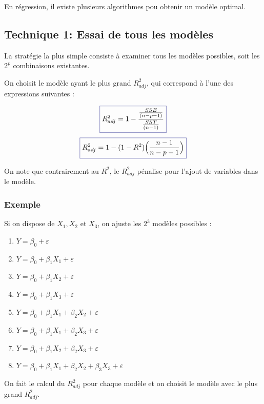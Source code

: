 \documentclass[11pt,french]{report}
\begin{document}
En régression, il existe plusieurs algorithmes pou obtenir un modèle optimal.

\subsection{Technique 1: Essai de tous les modèles}
\label{tech1}

La stratégie la plus simple consiste à examiner tous les modèles possibles, soit les $2^p$ combinaisons existantes. \newline

On choisit le modèle ayant le plus grand $R^2_{adj}$, qui correspond à l'une des expressions suivantes :

\begin{equation}
\color{Blue}
\boxed{\color{black}
R^2_{adj} = 1 - \frac{\frac{SSE}{(n-p-1)}}{\frac{SST}{(n-1)}} 
}
\end{equation}
\begin{equation}
\color{Blue}
\boxed{\color{black}
R^2_{adj} = 1 - (1 - R^2) \Big(\frac{n-1}{n-p-1} \Big) 
}
\end{equation}

On note que contrairement au $R^2$, le $R^2_{adj}$ pénalise pour l'ajout de variables dans le modèle.

\bigskip
\subsubsection*{Exemple}
Si on dispose de $X_1, X_2$ et $X_3$, on ajuste les $2^3$ modèles possibles :
\begin{enumerate}
\item $Y = \beta_0 + \varepsilon$
\item $Y = \beta_0 + \beta_1X_1 + \varepsilon$
\item $Y = \beta_0 + \beta_1X_2 + \varepsilon$
\item $Y = \beta_0 + \beta_1X_3 + \varepsilon$
\item $Y = \beta_0 + \beta_1X_1 + \beta_2X_2 + \varepsilon$
\item $Y = \beta_0 + \beta_1X_1 + \beta_2X_3 + \varepsilon$
\item $Y = \beta_0 + \beta_1X_2 + \beta_2X_3 + \varepsilon$
\item $Y = \beta_0 + \beta_1X_1 + \beta_2X_2 + \beta_3X_3 + \varepsilon$
\end{enumerate}
\bigskip
On fait le calcul du $R^2_{adj}$ pour chaque modèle et on choisit le modèle avec le plus grand $R^2_{adj}$.
\end{document}
